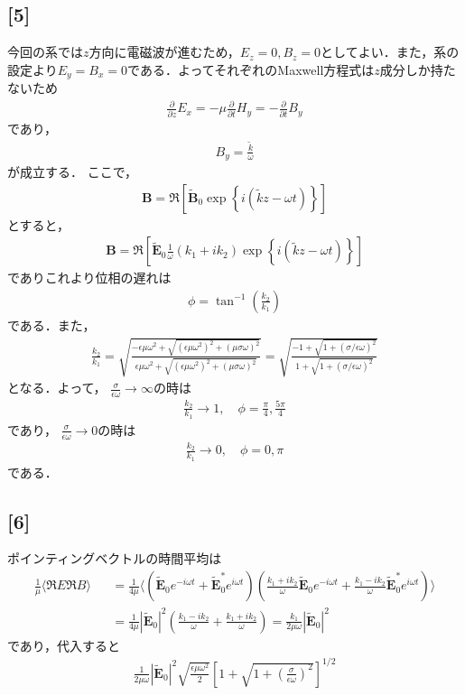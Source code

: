 \documentclass[12pt,dvipdfmx]{jsarticle}
\begin{document}
\subsection*{\large{[5]}}
今回の系では$z$方向に電磁波が進むため，$E_z=0,B_z=0$としてよい．また，系の設定より$E_y=B_x=0$である．よってそれぞれのMaxwell方程式は$z$成分しか持たないため
\begin{eqnarray}
  \frac{\partial}{\partial z}E_x = -\mu\frac{\partial}{\partial t}H_y = -\frac{\partial}{\partial t}B_y
\end{eqnarray}
であり，
\begin{eqnarray}
  B_y = \frac{\tilde{k}}{\omega}
\end{eqnarray}
が成立する．
ここで，
\begin{eqnarray}
  \bm{B} = \Re\left[ \tilde{\bm{B}}_0 \exp\left\{ i(\tilde{k}z-\omega t) \right\} \right]
\end{eqnarray}
とすると，
\begin{eqnarray}
  \bm{B} = \Re \left[ \tilde{\bm{E}}_0 \frac{1}{\omega}(k_1+ik_2)\exp\left\{ i(\tilde{k}z-\omega t) \right\} \right]
\end{eqnarray}
でありこれより位相の遅れは
\begin{eqnarray}
  \phi= \tan^{-1}\left( \frac{k_2}{k_1} \right)
\end{eqnarray}
である．また，
\begin{eqnarray}
  \frac{k_2}{k_1} = \sqrt{ \frac{-\epsilon\mu \omega^2+\sqrt{ (\epsilon\mu \omega^2)^2 + (\mu\sigma\omega)^2 }}{\epsilon\mu \omega^2+\sqrt{ (\epsilon\mu \omega^2)^2 + (\mu\sigma\omega)^2 }} }= \sqrt{ \frac{-1+ \sqrt{1+(\sigma/\epsilon\omega)^2}}{1+ \sqrt{1+(\sigma/\epsilon\omega)^2}} }
\end{eqnarray}
となる．よって，
$\frac{\sigma}{\epsilon\omega}\to\infty$の時は
\begin{eqnarray}
  \frac{k_2}{k_1} \to 1,\quad \phi= \frac{\pi}{4},\frac{5\pi}{4}
\end{eqnarray}
であり，
$\frac{\sigma}{\epsilon\omega}\to 0$の時は
\begin{eqnarray}
  \frac{k_2}{k_1} \to 0,\quad \phi= 0,\pi
\end{eqnarray}
である．
\subsection*{\large{[6]}}
ポインティングベクトルの時間平均は
\begin{eqnarray}
  \frac{1}{\mu}\langle \Re E \Re B \rangle &&= \frac{1}{4\mu}\langle ( \tilde{\bm{E}}_0e^{-i\omega t} +\tilde{\bm{E}}_0^{*}e^{i\omega t})( \frac{k_1+ik_2}{\omega}\tilde{\bm{E}}_0e^{-i\omega t} + \frac{k_1-ik_2}{\omega}\tilde{\bm{E}}^{*}_0e^{i\omega t} )\rangle\\
  &&=\frac{1}{4\mu}|\tilde{\bm{E}}_0|^2 \left( \frac{k_1-ik_2}{\omega} + \frac{k_1+ik_2}{\omega} \right) = \frac{k_1}{2\mu\omega} |\tilde{\bm{E}}_0|^2
\end{eqnarray}
であり，代入すると
\begin{eqnarray}
  \frac{1}{2\mu\omega} |\tilde{\bm{E}}_0|^2 \sqrt{\frac{\epsilon\mu\omega^2}{2}}\left[ 1+\sqrt{1+\left(\frac{\sigma}{\epsilon\omega}\right)^2} \right]^{1/2}
\end{eqnarray}
\end{document}
